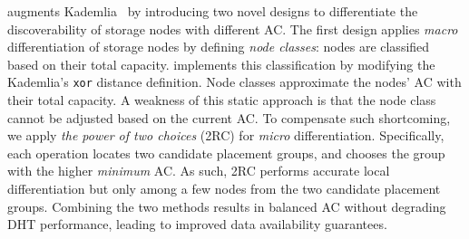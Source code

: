 \dht augments Kademlia~\cite{maymounkov2002kademlia} by introducing two novel designs to differentiate the discoverability of storage nodes with different AC.
The first design applies \emph{macro} differentiation of storage nodes by defining \emph{node classes}: nodes are classified based on their total capacity.
\dht implements this classification by modifying the Kademlia's \texttt{xor} distance definition.
Node classes approximate the nodes' AC with their total capacity.
A weakness of this static approach is that the node class cannot be adjusted based on the current AC.
To compensate such shortcoming, we apply \emph{the power of two choices} (2RC) for \emph{micro} differentiation.
Specifically, each \ffind operation locates two candidate placement groups, and chooses the group with the higher \emph{minimum} AC.
As such, 2RC performs accurate local differentiation but only among a few nodes from the two candidate placement groups.
Combining the two methods results in balanced AC without degrading DHT performance, leading to improved data availability guarantees.

%
\fi